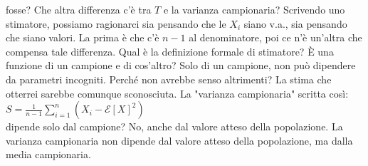 \documentclass{article}
\begin{document}
    fosse? Che altra differenza c'è tra $ T $ e la varianza campionaria? Scrivendo uno stimatore, possiamo ragionarci sia pensando che le $ X_i $ siano v.a., sia pensando che siano
    valori. La prima è che c'è $ n - 1 $ al denominatore, poi ce n'è un'altra che compensa tale differenza. Qual è la definizione formale di stimatore? È una funzione di un
    campione e di cos'altro? Solo di un campione, non può dipendere da parametri incogniti. Perché non avrebbe senso altrimenti? La stima che otterrei sarebbe comunque sconosciuta.
    La "varianza campionaria" scritta così: \\
    $ S = \frac{ 1 }{ n - 1 } \sum_{ i = 1 }^n ( X_i - \mathcal E [ X ]^2 ) $ \\
    dipende solo dal campione? No, anche dal valore atteso della popolazione. La varianza campionaria non dipende dal valore atteso della popolazione, ma dalla media campionaria.
    
\end{document}
